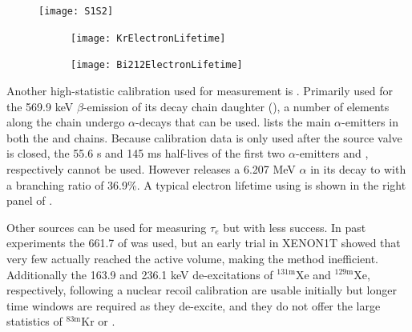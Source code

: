 {\begin{figure}
\centering
\texttt{[image: S1S2]}
\label{fig:calibrations_kr_s1_s2}
\end{figure}

\begin{figure}
    \centering
    \begin{subfigure}[t]{0.45\textwidth}
        \centering
        \texttt{[image: KrElectronLifetime]}
    \end{subfigure}%
    \begin{subfigure}[t]{0.45\textwidth}
        \centering
        \texttt{[image: Bi212ElectronLifetime]}
    \end{subfigure}
    \caption{}
	\label{fig:calibrations_elifetime}
\end{figure}

Another high-statistic calibration used for measurement is .  Primarily used for the 569.9 keV $\beta$-emission of its
decay chain daughter  (), a number of elements along the chain
undergo $\alpha$-decays that can be
used.   lists the main $\alpha$-emitters in both the  and  chains.  Because calibration
data is only used after the source valve is closed, the 55.6 s and 145 ms half-lives of the first two $\alpha$-emitters  and
, respectively cannot be used.  However  releases a 6.207 MeV $\alpha$ in its decay to  with a
branching ratio of 36.9\%.  A typical electron lifetime using  is shown in the right panel of
.

Other sources can be used for measuring $\tau_e$ but with less success.  In past experiments the 661.7 \gammaray of  was
used, but an early trial in XENON1T showed that very few actually reached the active volume, making the method inefficient.  Additionally
the 163.9 and 236.1 keV de-excitations of $\mathrm{^{131m}Xe}$ and $\mathrm{^{129m}Xe}$, respectively, following a nuclear recoil calibration are
usable initially but longer time windows are required as they de-excite, and they do not offer the large statistics of $\mathrm{^{83m}Kr}$
or .

}
